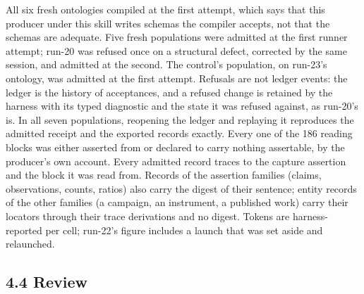 All six fresh ontologies compiled at the first attempt, which says that this producer under this skill writes schemas the compiler accepts, not that the schemas are adequate. Five fresh populations were admitted at the first runner attempt; run-20 was refused once on a structural defect, corrected by the same session, and admitted at the second. The control's population, on run-23's ontology, was admitted at the first attempt. Refusals are not ledger events: the ledger is the history of acceptances, and a refused change is retained by the harness with its typed diagnostic and the state it was refused against, as run-20's is. In all seven populations, reopening the ledger and replaying it reproduces the admitted receipt and the exported records exactly. Every one of the 186 reading blocks was either asserted from or declared to carry nothing assertable, by the producer's own account. Every admitted record traces to the capture assertion and the block it was read from. Records of the assertion families (claims, observations, counts, ratios) also carry the digest of their sentence; entity records of the other families (a campaign, an instrument, a published work) carry their locators through their trace derivations and no digest. Tokens are harness-reported per cell; run-22's figure includes a launch that was set aside and relaunched.

\subsection*{4.4 Review}

